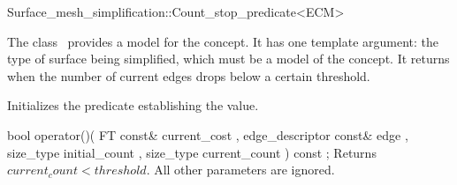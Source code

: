 

\begin{ccRefClass}{Surface_mesh_simplification::Count_stop_predicate<ECM>}


\ccDefinition

The class \ccRefName\ provides a model for the  concept.
It has one template argument: the type of surface being simplified,
which must be a model of the  concept.
It returns  when the number of current edges drops below a certain threshold.


\ccIsModel
{}

\ccCreation
{}  %

{Initializes the predicate establishing the  value.} 

\ccOperations

  \ccMethod
    {bool operator()( FT const&              current_cost
                    , edge_descriptor const& edge
                    , size_type              initial_count
                    , size_type              current_count
                    ) const ;
           }
  {Returns $current_count<threshold$. All other parameters are ignored.}

\ccSeeAlso
{}

\end{ccRefClass}


